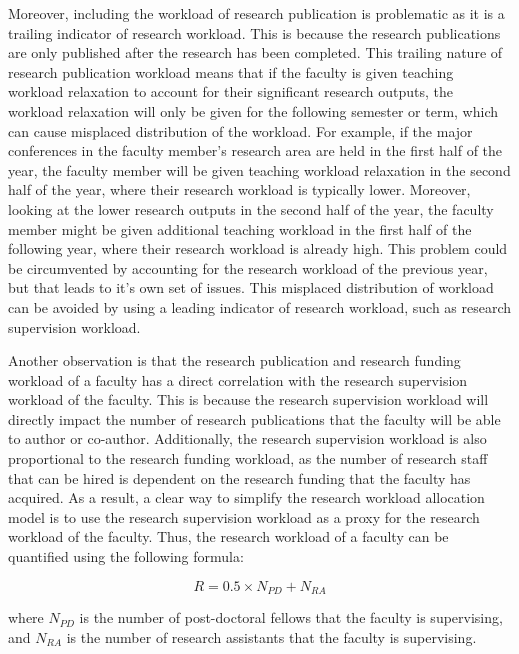 Moreover, including the workload of research publication is problematic as it is a trailing indicator of research workload. This is because the research publications are only published after the research has been completed. This trailing nature of research publication workload means that if the faculty is given teaching workload relaxation to account for their significant research outputs, the workload relaxation will only be given for the following semester or term, which can cause misplaced distribution of the workload. For example, if the major conferences in the faculty member's research area are held in the first half of the year, the faculty member will be given teaching workload relaxation in the second half of the year, where their research workload is typically lower. Moreover, looking at the lower research outputs in the second half of the year, the faculty member might be given additional teaching workload in the first half of the following year, where their research workload is already high. This problem could be circumvented by accounting for the research workload of the previous year, but that leads to it's own set of issues. This misplaced distribution of workload can be avoided by using a leading indicator of research workload, such as research supervision workload.

Another observation is that the research publication and research funding workload of a faculty has a direct correlation with the research supervision workload of the faculty. This is because the research supervision workload will directly impact the number of research publications that the faculty will be able to author or co-author. Additionally, the research supervision workload is also proportional to the research funding workload, as the number of research staff that can be hired is dependent on the research funding that the faculty has acquired. As a result, a clear way to simplify the research workload allocation model is to use the research supervision workload as a proxy for the research workload of the faculty. Thus, the research workload of a faculty can be quantified using the following formula:

\begin{equation*}
      R = 0.5 \times N_{PD} +  N_{RA}
\end{equation*}

where $N_{PD}$ is the number of post-doctoral fellows that the faculty is supervising, and $N_{RA}$ is the number of research assistants that the faculty is supervising.

